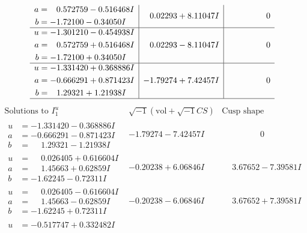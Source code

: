 \documentclass[1p]{elsarticle_modified}
\theoremstyle{definition}
\newcommand{\I}{\sqrt{-1}}
\begin{document}
$$\begin{array}{c|c|c}
\begin{aligned}
a &= \phantom{-}0.572759 - 0.516468 I \\
b &= -1.72100 - 0.34050 I\end{aligned}
 & \phantom{-}0.02293 + 8.11047 I & \phantom{-0.000000 } 0 \\ \hline\begin{aligned}
u &= -1.301210 - 0.454938 I \\
a &= \phantom{-}0.572759 + 0.516468 I \\
b &= -1.72100 + 0.34050 I\end{aligned}
 & \phantom{-}0.02293 - 8.11047 I & \phantom{-0.000000 } 0 \\ \hline\begin{aligned}
u &= -1.331420 + 0.368886 I \\
a &= -0.666291 + 0.871423 I \\
b &= \phantom{-}1.29321 + 1.21938 I\end{aligned}
 & -1.79274 + 7.42457 I & \phantom{-0.000000 } 0\\
 \hline 
 \end{array}$$\newpage$$\begin{array}{c|c|c}  
\text{Solutions to }I^u_{1}& \I (\text{vol} + \sqrt{-1}CS) & \text{Cusp shape}\\
 \hline 
\begin{aligned}
u &= -1.331420 - 0.368886 I \\
a &= -0.666291 - 0.871423 I \\
b &= \phantom{-}1.29321 - 1.21938 I\end{aligned}
 & -1.79274 - 7.42457 I & \phantom{-0.000000 } 0 \\ \hline\begin{aligned}
u &= \phantom{-}0.026405 + 0.616604 I \\
a &= \phantom{-}1.45663 + 0.62859 I \\
b &= -1.62245 - 0.72311 I\end{aligned}
 & -0.20238 + 6.06846 I & \phantom{-}3.67652 - 7.39581 I \\ \hline\begin{aligned}
u &= \phantom{-}0.026405 - 0.616604 I \\
a &= \phantom{-}1.45663 - 0.62859 I \\
b &= -1.62245 + 0.72311 I\end{aligned}
 & -0.20238 - 6.06846 I & \phantom{-}3.67652 + 7.39581 I \\ \hline\begin{aligned}
u &= -0.517747 + 0.332482 I \\

\end{aligned}
\end{array}$$
\end{document}
